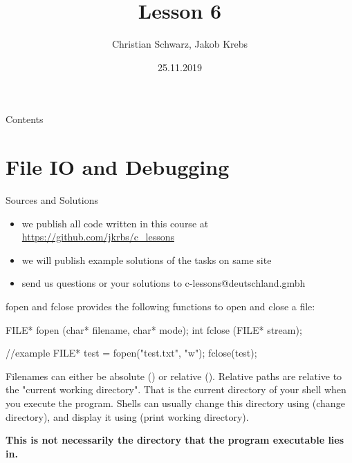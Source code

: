 \documentclass[10pt,graphics,aspectratio=169,table]{beamer}
\title{Lesson 6}
\author{Christian Schwarz, Jakob Krebs}
\date{25.11.2019}
\begin{document}
\maketitle

\begin{frame}{Contents}
    \tableofcontents
\end{frame}


\section{File IO and Debugging}
\begin{frame}{Sources and Solutions}
    \begin{itemize}
        \item we publish all code written in this course at \url{https://github.com/jkrbs/c_lessons}
        \item we will publish example solutions of the tasks on same site
        \item send us questions or your solutions to c-lessons@deutschland.gmbh
    \end{itemize}
\end{frame}

\begin{frame}[fragile]{fopen and fclose}
     provides the following functions to open and close a file:

    \begin{codeblock}
FILE* fopen (char* filename, char* mode);
int fclose (FILE* stream);

//example
FILE* test = fopen("test.txt", "w");
fclose(test);
    \end{codeblock}

    Filenames can either be absolute () 
    or relative (). 
    Relative paths are relative to the "current working directory".
    That is the current directory of your shell when you execute the program.
    Shells can usually change this directory using  (change directory), 
    and display it using  (print working directory).


    \textbf{This is not necessarily the directory that the program executable lies in.}  
\end{frame}
    
\end{document}

